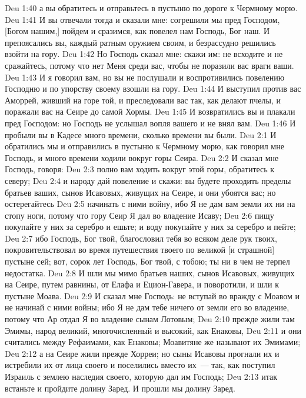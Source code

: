 \vs Deu 1:40 а вы обратитесь и отправьтесь в пустыню по дороге к Чермному морю.
\vs Deu 1:41 И вы отвечали тогда и сказали мне: согрешили мы пред Господом, [Богом нашим,] пойдем и сразимся, как повелел нам Господь, Бог наш. И препоясались вы, каждый ратным оружием своим, и безрассудно решились взойти на гору.
\vs Deu 1:42 Но Господь сказал мне: скажи им: не всходите и не сражайтесь, потому что нет Меня среди вас, чтобы не поразили вас враги ваши.
\vs Deu 1:43 И я говорил вам, но вы не послушали и воспротивились повелению Господню и по упорству своему взошли на гору.
\vs Deu 1:44 И выступил против вас Аморрей, живший на горе той, и преследовали вас так, как делают пчелы, и поражали вас на Сеире до самой Хормы.
\vs Deu 1:45 И возвратились вы и плакали пред Господом: но Господь не услышал вопля вашего и не внял вам.
\vs Deu 1:46 И пробыли вы в Кадесе много времени, сколько времени вы  были.
\vs Deu 2:1 И обратились мы и отправились в пустыню к Чермному морю, как говорил мне Господь, и много времени ходили вокруг горы Сеира.
\vs Deu 2:2 И сказал мне Господь, говоря:
\vs Deu 2:3 полно вам ходить вокруг этой горы, обратитесь к северу;
\vs Deu 2:4 и народу дай повеление и скажи: вы будете проходить пределы братьев ваших, сынов Исавовых, живущих на Сеире, и они убоятся вас; но остерегайтесь
\vs Deu 2:5 начинать с ними войну, ибо Я не дам вам земли их ни на стопу ноги, потому что гору Сеир Я дал во владение Исаву;
\vs Deu 2:6 пищу покупайте у них за серебро и ешьте; и воду покупайте у них за серебро и пейте;
\vs Deu 2:7 ибо Господь, Бог твой, благословил тебя во всяком деле рук твоих, покровительствовал  во время путешествия твоего по великой [и страшной] пустыне сей; вот, сорок лет Господь, Бог твой, с тобою; ты ни в чем не терпел недостатка.
\vs Deu 2:8 И шли мы мимо братьев наших, сынов Исавовых, живущих на Сеире, путем равнины, от Елафа и Ецион-Гавера, и поворотили, и шли к пустыне Моава.
\vs Deu 2:9 И сказал мне Господь: не вступай во вражду с Моавом и не начинай с ними войны; ибо Я не дам тебе ничего от земли его во владение, потому что Ар отдал Я во владение сынам Лотовым;
\vs Deu 2:10 прежде жили там Эмимы, народ великий, многочисленный и высокий, как  Енаковы,
\vs Deu 2:11 и они считались между Рефаимами, как  Енаковы; Моавитяне же называют их Эмимами;
\vs Deu 2:12 а на Сеире жили прежде Хорреи; но сыны Исавовы прогнали их и истребили их от лица своего и поселились вместо их~--- так, как поступил Израиль с землею наследия своего, которую дал им Господь;
\vs Deu 2:13 итак встаньте и пройдите долину Заред. И прошли мы долину Заред.
